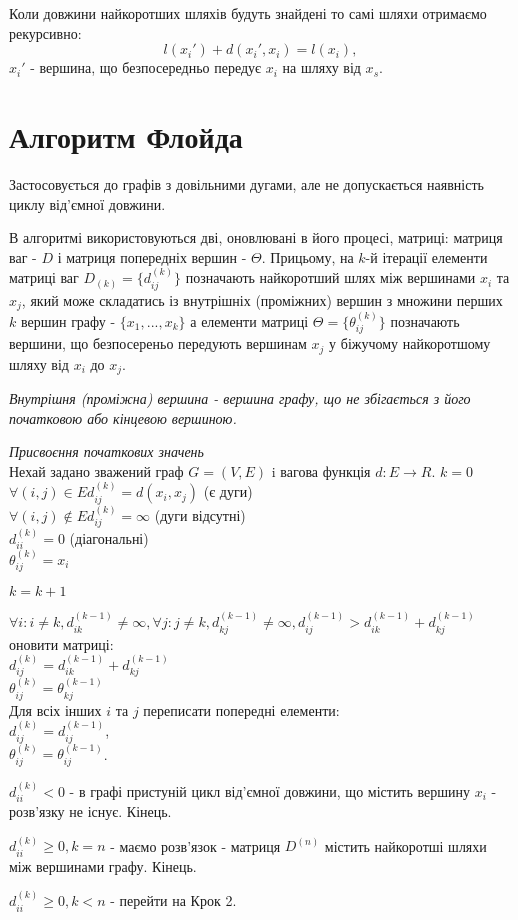 \documentclass[12pt,a4paper]{book}
\newenvironment{slim_enumerate}{
\begin{enumerate}
  \setlength{\itemsep}{1pt}
  \setlength{\parskip}{0pt}
  \setlength{\parsep}{0pt}}
{\end{enumerate}}
\begin{document}
Коли довжини найкоротших шляхів будуть знайдені то самі шляхи отримаємо рекурсивно:
$$l(x_i')+d(x_i',x_i)=l(x_i),$$
$x_i'$ - вершина, що безпосередньо передує $x_i$ на шляху від $x_s$.

\section{Алгоритм Флойда}

Застосовується до графів з довільними дугами, але не допускається наявність циклу від’ємної довжини.

В алгоритмі використовуються дві, оновлювані в його процесі, матриці: матриця ваг - $D$ і матриця попередніх вершин - $\Theta$. Прицьому, на $k$-й ітерації елементи матриці ваг $D_{(k)}=\{d_{ij}^{(k)}\}$ позначають найкоротший шлях між вершинами $x_i$ та $x_j$, який може складатись із внутрішніх (проміжних) вершин з множини перших $k$ вершин графу - $\{x_1, ..., x_k\}$ а елементи матриці $\Theta=\{\theta_{ij}^{(k)}\}$ позначають вершини, що безпосереньо передують вершинам $x_j$ у біжучому найкоротшому шляху від $x_i$ до $x_j$.

\emph{Внутрішня (проміжна) вершина - вершина графу, що не збігається з його початковою або кінцевою вершиною.}

\begin{slim_enumerate}
  \item \emph{Присвоєння початкових значень}\\
Нехай задано зважений граф $G=(V,E)$ i вагова функція $d:E \rightarrow R$.
$k=0$\\
$\forall (i,j) \in E d_{ij}^{(k)}=d(x_i,x_j)$ (є дуги)\\
$\forall (i,j) \notin E d_{ij}^{(k)}=\infty$ (дуги відсутні)\\
$d_{ii}^{(k)}=0$ (діагональні)\\
$\theta_{ij}^{(k)}=x_i$
  \item $k=k+1$
  \item $\forall i: i \neq k, d_{ik}^{(k-1)} \neq \infty, \forall j: j \neq k, d_{kj}^{(k-1)} \neq \infty, d_{ij}^{(k-1)}>d_{ik}^{(k-1)}+d_{kj}^{(k-1)}$ оновити матриці:\\
$d_{ij}^{(k)}=d_{ik}^{(k-1)}+d_{kj}^{(k-1)}$\\
$\theta_{ij}^{(k)}=\theta_{kj}^{(k-1)}$\\
Для всіх інших $i$ та $j$ переписати попередні елементи:\\
$d_{ij}^{(k)}=d_{ij}^{(k-1)}$,\\
$\theta_{ij}^{(k)}=\theta_{ij}^{(k-1)}$.
  \item 
    \begin{slim_enumerate}
      \item $d_{ii}^{(k)} < 0$ - в графі пристуній цикл від’ємної довжини, що містить вершину $x_i$ - розв’язку не існує. Кінець.
      \item $d_{ii}^{(k)} \ge 0, k=n$ - маємо розв’язок - матриця $D^{(n)}$ містить найкоротші шляхи між вершинами графу. Кінець.
      \item $d_{ii}^{(k)} \ge 0, k<n$ - перейти на Крок 2.
    \end{slim_enumerate}
\end{slim_enumerate}
\end{document}
